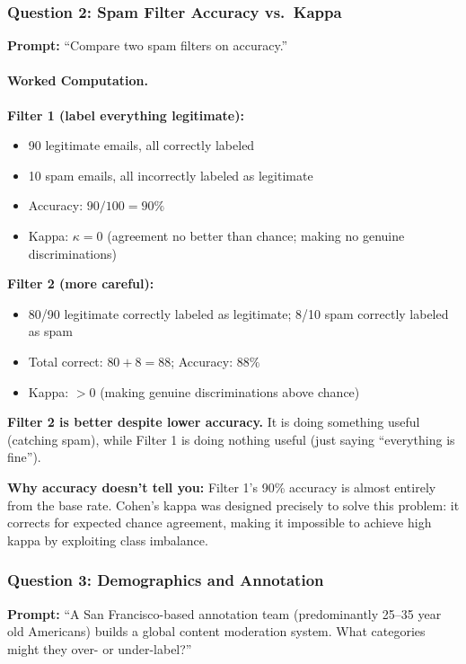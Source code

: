 \subsubsection{Question 2: Spam Filter Accuracy vs.\ Kappa}

\textbf{Prompt:} ``Compare two spam filters on accuracy.''

\paragraph{Worked Computation.}

\textbf{Filter 1 (label everything legitimate):}
\begin{itemize}
    \item 90 legitimate emails, all correctly labeled
    \item 10 spam emails, all incorrectly labeled as legitimate
    \item Accuracy: $90/100 = 90\%$
    \item Kappa: $\kappa = 0$ (agreement no better than chance; making no genuine discriminations)
\end{itemize}

\textbf{Filter 2 (more careful):}
\begin{itemize}
    \item 80/90 legitimate correctly labeled as legitimate; 8/10 spam correctly labeled as spam
    \item Total correct: $80 + 8 = 88$; Accuracy: $88\%$
    \item Kappa: $>0$ (making genuine discriminations above chance)
\end{itemize}

\textbf{Filter 2 is better despite lower accuracy.} It is doing something useful (catching spam), while Filter 1 is doing nothing useful (just saying ``everything is fine'').

\textbf{Why accuracy doesn't tell you:} Filter 1's 90\% accuracy is almost entirely from the base rate. Cohen's kappa was designed precisely to solve this problem: it corrects for expected chance agreement, making it impossible to achieve high kappa by exploiting class imbalance.

\subsubsection{Question 3: Demographics and Annotation}

\textbf{Prompt:} ``A San Francisco-based annotation team (predominantly 25--35 year old Americans) builds a global content moderation system. What categories might they over- or under-label?''

